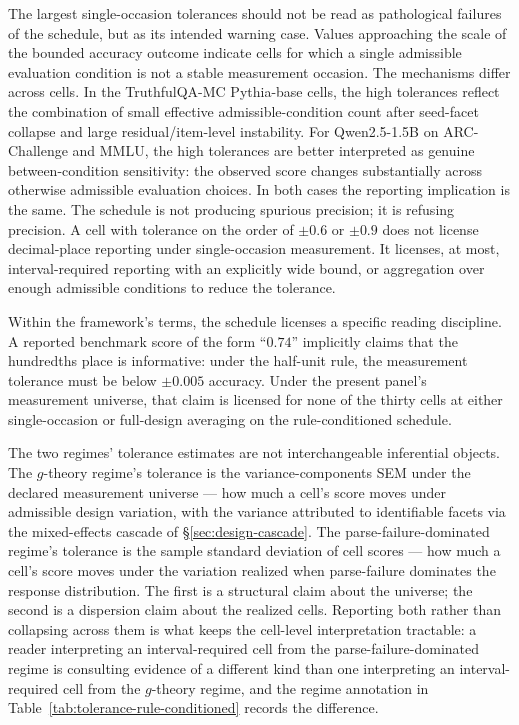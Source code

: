 \documentclass[11pt]{article}
\begin{document}
The largest single-occasion tolerances should not be read as pathological failures of the schedule, but as its intended warning case. Values approaching the scale of the bounded accuracy outcome indicate cells for which a single admissible evaluation condition is not a stable measurement occasion. The mechanisms differ across cells. In the TruthfulQA-MC Pythia-base cells, the high tolerances reflect the combination of small effective admissible-condition count after seed-facet collapse and large residual/item-level instability. For Qwen2.5-1.5B on ARC-Challenge and MMLU, the high tolerances are better interpreted as genuine between-condition sensitivity: the observed score changes substantially across otherwise admissible evaluation choices. In both cases the reporting implication is the same. The schedule is not producing spurious precision; it is refusing precision. A cell with tolerance on the order of $\pm 0.6$ or $\pm 0.9$ does not license decimal-place reporting under single-occasion measurement. It licenses, at most, interval-required reporting with an explicitly wide bound, or aggregation over enough admissible conditions to reduce the tolerance.

Within the framework's terms, the schedule licenses a specific reading discipline. A reported benchmark score of the form ``$0.74$'' implicitly claims that the hundredths place is informative: under the half-unit rule, the measurement tolerance must be below $\pm 0.005$ accuracy. Under the present panel's measurement universe, that claim is licensed for none of the thirty cells at either single-occasion or full-design averaging on the rule-conditioned schedule.

The two regimes' tolerance estimates are not interchangeable inferential objects. The $g$-theory regime's tolerance is the variance-components SEM under the declared measurement universe --- how much a cell's score moves under admissible design variation, with the variance attributed to identifiable facets via the mixed-effects cascade of §\ref{sec:design-cascade}. The parse-failure-dominated regime's tolerance is the sample standard deviation of cell scores --- how much a cell's score moves under the variation realized when parse-failure dominates the response distribution. The first is a structural claim about the universe; the second is a dispersion claim about the realized cells. Reporting both rather than collapsing across them is what keeps the cell-level interpretation tractable: a reader interpreting an interval-required cell from the parse-failure-dominated regime is consulting evidence of a different kind than one interpreting an interval-required cell from the $g$-theory regime, and the regime annotation in Table~\ref{tab:tolerance-rule-conditioned} records the difference.
\end{document}
